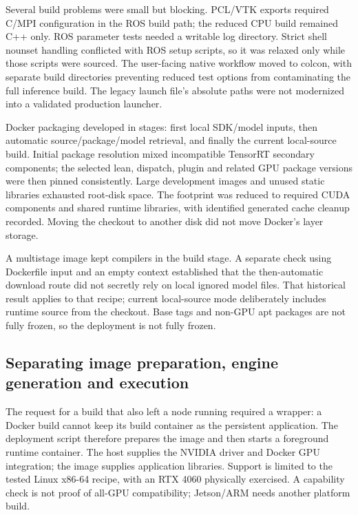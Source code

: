 \documentclass[11pt,a4paper]{article}
\begin{document}
Several build problems were small but blocking. PCL/VTK exports required C/MPI configuration in the ROS build path; the reduced CPU build remained C++ only. ROS parameter tests needed a writable log directory. Strict shell nounset handling conflicted with ROS setup scripts, so it was relaxed only while those scripts were sourced. The user-facing native workflow moved to colcon, with separate build directories preventing reduced test options from contaminating the full inference build. The legacy launch file's absolute paths were not modernized into a validated production launcher.

Docker packaging developed in stages: first local SDK/model inputs, then automatic source/package/model retrieval, and finally the current local-source build. Initial package resolution mixed incompatible TensorRT secondary components; the selected lean, dispatch, plugin and related GPU package versions were then pinned consistently. Large development images and unused static libraries exhausted root-disk space. The footprint was reduced to required CUDA components and shared runtime libraries, with identified generated cache cleanup recorded. Moving the checkout to another disk did not move Docker's layer storage.

A multistage image kept compilers in the build stage. A separate check using Dockerfile input and an empty context established that the then-automatic download route did not secretly rely on local ignored model files. That historical result applies to that recipe; current local-source mode deliberately includes runtime source from the checkout. Base tags and non-GPU apt packages are not fully frozen, so the deployment is not fully frozen.

\subsection{Separating image preparation, engine generation and execution}

The request for a build that also left a node running required a wrapper: a Docker build cannot keep its build container as the persistent application. The deployment script therefore prepares the image and then starts a foreground runtime container. The host supplies the NVIDIA driver and Docker GPU integration; the image supplies application libraries. Support is limited to the tested Linux x86-64 recipe, with an RTX 4060 physically exercised. A capability check is not proof of all-GPU compatibility; Jetson/ARM needs another platform build.
\end{document}
